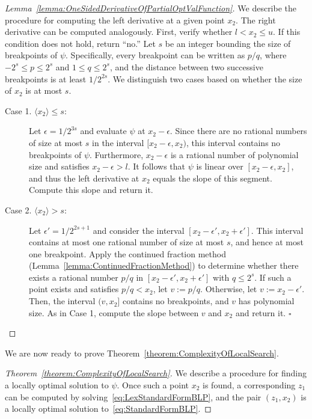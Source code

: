 \documentclass[runningheads,orivec]{llncs}
\newcommand{\MacroColor}[1]{#1}
\newcommand{\MyQED}{\mbox{}\hfill$\square$}
\newcommand{\Size}[1]{\langle#1\rangle}
\newcommand{\PartialOptValFunc}{\MacroColor{\psi}}
\begin{document}
\begin{appendix}
\begin{proof}[Lemma~\ref{lemma:OneSidedDerivativeOfPartialOptValFunction}]
We describe the procedure for computing the left derivative at a given point $x_2$.
The right derivative can be computed analogously.
First, verify whether $l < x_2 \le u$.
If this condition does not hold, return ``no.''
Let $s$ be an integer bounding the size of breakpoints of $\PartialOptValFunc$.
Specifically, every breakpoint can be written as $p/q$, where $-2^s \le p \le 2^s$ and $1 \le q \le 2^s$, and the distance between two successive breakpoints is at least $1/2^{2s}$.
We distinguish two cases based on whether the size of $x_2$ is at most $s$.
\begin{description}
\item[Case 1. $\Size{x_2} \le s$:]
Let $\epsilon = 1 / 2^{3s}$ and evaluate $\PartialOptValFunc$ at $x_2 - \epsilon$.
Since there are no rational numbers of size at most $s$ in the interval $[x_2 - \epsilon, x_2)$, this interval contains no breakpoints of $\PartialOptValFunc$.
Furthermore, $x_2 - \epsilon$ is a rational number of polynomial size and satisfies $x_2 - \epsilon > l$.
It follows that $\PartialOptValFunc$ is linear over $[x_2 - \epsilon, x_2]$, and thus the left derivative at $x_2$ equals the slope of this segment.
Compute this slope and return it.
\item[Case 2. $\Size{x_2} > s$:]
Let $\epsilon' = 1 / 2^{2s + 1}$ and consider the interval $[x_2 - \epsilon', x_2 + \epsilon']$.
This interval contains at most one rational number of size at most $s$, and hence at most one breakpoint.
Apply the continued fraction method (Lemma~\ref{lemma:ContinuedFractionMethod}) to determine whether there exists a rational number $p/q$ in $[x_2 - \epsilon', x_2 + \epsilon']$ with $q \le 2^s$.
If such a point exists and satisfies $p/q < x_2$, let $v := p/q$.
Otherwise, let $v := x_2 - \epsilon'$.
Then, the interval $(v, x_2]$ contains no breakpoints, and $v$ has polynomial size.
As in Case 1, compute the slope between $v$ and $x_2$ and return it.
\MyQED
\end{description}
\end{proof}


We are now ready to prove Theorem~\ref{theorem:ComplexityOfLocalSearch}.

\begin{proof}[Theorem~\ref{theorem:ComplexityOfLocalSearch}]
We describe a procedure for finding a locally optimal solution to $\PartialOptValFunc$.
Once such a point $x_2$ is found, a corresponding $z_1$ can be computed by solving~\eqref{eq:LexStandardFormBLP}, and the pair $(z_1, x_2)$ is a locally optimal solution to~\eqref{eq:StandardFormBLP}.


\end{proof}
\end{appendix}
\end{document}
